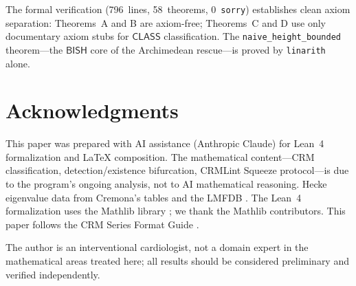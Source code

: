 \documentclass[11pt]{article}
\theoremstyle{plain}
\theoremstyle{definition}
\theoremstyle{remark}
\newcommand{\BISH}{\ensuremath{\mathsf{BISH}}}
\newcommand{\CLASS}{\ensuremath{\mathsf{CLASS}}}
\begin{document}
The formal verification (796~lines, 58~theorems, 0~\texttt{sorry}) establishes clean axiom separation: Theorems~A and B are axiom-free; Theorems~C and D use only documentary axiom stubs for $\CLASS$ classification. The \texttt{naive\_height\_bounded} theorem---the $\BISH$ core of the Archimedean rescue---is proved by \texttt{linarith} alone.


\section*{Acknowledgments}

This paper was prepared with AI assistance (Anthropic Claude) for Lean~4 formalization and LaTeX composition. The mathematical content---CRM classification, detection/existence bifurcation, CRMLint Squeeze protocol---is due to the program's ongoing analysis, not to AI mathematical reasoning. Hecke eigenvalue data from Cremona's tables \cite{cremona} and the LMFDB \cite{lmfdb}. The Lean~4 formalization uses the Mathlib library \cite{mathlib4}; we thank the Mathlib contributors. This paper follows the CRM Series Format Guide \cite{format-guide}.

The author is an interventional cardiologist, not a domain expert in the mathematical areas treated here; all results should be considered preliminary and verified independently.
\end{document}
